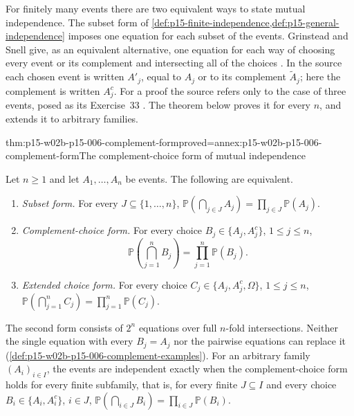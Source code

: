 For finitely many events there are two equivalent ways to state mutual
independence. The subset form of
\cref{def:p15-finite-independence,def:p15-general-independence} imposes
one equation for each subset of the events. Grinstead and Snell give,
as an equivalent alternative, one equation for each way of choosing
every event or its complement and intersecting all of the choices
\cite[sec.~4.1, Definition~4.2, p.~141]{GrinsteadSnellChance2006}. In
the source each chosen event is written \(A'_j\), equal to \(A_j\) or
to its complement \(\tilde A_j\); here the complement is written
\(A_j^c\). For a proof the source refers only to the case of three
events, posed as its Exercise~33
\cite[sec.~4.1, p.~155]{GrinsteadSnellChance2006}.
The theorem below proves it for every \(n\), and extends it to
arbitrary families.

\begin{hbtheorem}{thm:p15-w02b-p15-006-complement-form}{proved=annex:p15-w02b-p15-006-complement-form}{The complement-choice form of mutual independence}
\par\nobreak
Let \(n\geq1\) and let \(A_1,\ldots,A_n\) be events. The following
are equivalent.
\begin{enumerate}
\item \emph{Subset form.} For every \(J\subseteq\{1,\ldots,n\}\),
      \(\mathbb P(\bigcap_{j\in J}A_j)=\prod_{j\in J}\mathbb P(A_j)\).
\item \emph{Complement-choice form.} For every choice
      \(B_j\in\{A_j,A_j^c\}\), \(1\leq j\leq n\),
      \[
       \mathbb P\left(\bigcap_{j=1}^nB_j\right)
                         =\prod_{j=1}^n\mathbb P(B_j).
      \]
\item \emph{Extended choice form.} For every choice
      \(C_j\in\{A_j,A_j^c,\Omega\}\), \(1\leq j\leq n\),
      \(\mathbb P(\bigcap_{j=1}^nC_j)=\prod_{j=1}^n\mathbb P(C_j)\).
\end{enumerate}
The second form consists of \(2^n\) equations over full \(n\)-fold
intersections. Neither the single equation with every \(B_j=A_j\) nor
the pairwise equations can replace it
(\cref{def:p15-w02b-p15-006-complement-examples}).
For an arbitrary family \((A_i)_{i\in I}\), the events are independent
exactly when the complement-choice form holds for every finite
subfamily, that is, for every finite \(J\subseteq I\) and every choice
\(B_i\in\{A_i,A_i^c\}\), \(i\in J\),
\(\mathbb P(\bigcap_{i\in J}B_i)=\prod_{i\in J}\mathbb P(B_i)\).
\end{hbtheorem}

